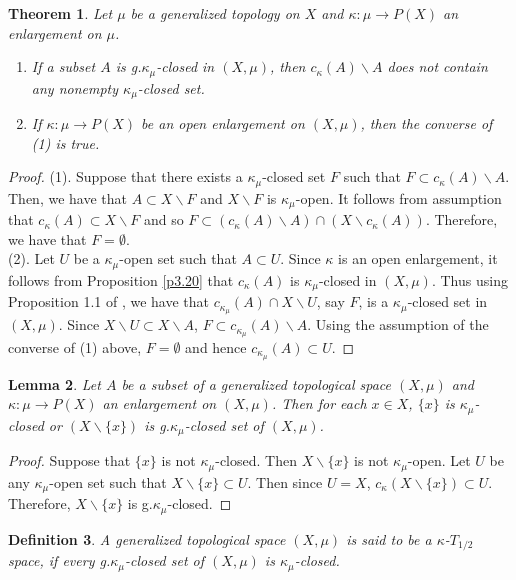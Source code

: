 \documentclass{matua}
\newtheorem{theorem}{Theorem}[section]
\newtheorem{definition}[theorem]{Definition}
\newtheorem{lemma}[theorem]{Lemma}
\begin{document}
\begin{theorem}
Let $\mu$ be a generalized topology on $X$ and $\kappa: \mu\rightarrow P(X)$ an enlargement on $\mu$.
\begin{enumerate}\label{t4.3}
\item If a subset $A$ is g.$\kappa_\mu$-closed in $(X, \mu)$, then $c_\kappa(A)\backslash A$ does not contain any nonempty $\kappa_\mu$-closed set.
\item If $\kappa : \mu\rightarrow P(X)$ be an open enlargement on $(X, \mu)$, then the converse of (1) is true.
\end{enumerate}
\end{theorem}
\begin{proof}
(1). Suppose that there exists a $\kappa_\mu$-closed set $F$ such that $F\subset  c_{\kappa}(A)\backslash A$. Then, we have that $A \subset X\backslash F$ and $X\backslash F$ is $\kappa_\mu$-open. It follows from assumption that $c_{\kappa}(A) \subset X\backslash F$ and so $F \subset (c_{\kappa}(A)\backslash A) \cap (X\backslash  c_{\kappa}(A))$. Therefore, we have that $F = \emptyset$.\\
(2). Let $U$ be a $\kappa_\mu$-open set such that $A \subset U$. Since $\kappa$ is an open enlargement, it follows from Proposition \ref{p3.20} that $c_{\kappa}(A)$ is $\kappa_\mu$-closed in $(X, \mu)$. Thus using Proposition 1.1 of \cite{cs3},
we have that $c_{\kappa_\mu}(A) \cap X\backslash U$, say $F$, is a $\kappa_\mu$-closed set in $(X, \mu)$. Since $X\backslash U\subset X\backslash A$, $F\subset c_{\kappa_\mu}(A)\backslash A$. Using the assumption of the converse of (1) above, $F = \emptyset$ and hence $c_{\kappa_\mu}(A)\subset U$.
\end{proof}

\begin{lemma}\label{l4.5}
Let $A$ be a subset of a generalized topological space $(X, \mu)$ and $\kappa :  \mu\rightarrow P(X)$ an enlargement on $(X, \mu)$. Then for each $x\in X$, $\{x\}$ is $\kappa_\mu$-closed or $(X\backslash \{x\})$ is g.$\kappa_\mu$-closed set of $(X, \mu)$.
\end{lemma}
\begin{proof}
Suppose that $\{x\}$ is not $\kappa_\mu$-closed. Then $X\backslash\{x\}$ is not $\kappa_\mu$-open. Let $U$ be any $\kappa_\mu$-open set such that $X\backslash \{x\}\subset U$. Then since $U = X$, $c_\kappa(X\backslash \{x\}) \subset U$. Therefore, $X\backslash \{x\}$ is g.$\kappa_\mu$-closed.
\end{proof}
\begin{definition}\label{d5.1}
A generalized topological space $(X, \mu)$ is said to be a $\kappa$-$T_{1/2}$
space, if every g.$\kappa_\mu$-closed set of $(X, \mu)$ is $\kappa_\mu$-closed.
\end{definition}
\end{document}
